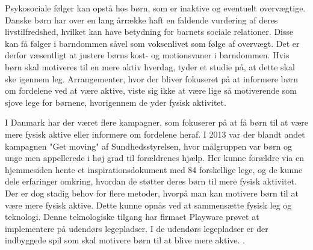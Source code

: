 
Psykosociale følger kan opstå hos børn, som er inaktive og eventuelt overvægtige. Danske børn har over en lang årrække haft en faldende vurdering af deres livstilfredshed, hvilket kan have betydning for barnets sociale relationer. Disse kan få følger i barndommen såvel som voksenlivet som følge af overvægt. Det er derfor væsentligt at justere børns kost- og motionsvaner i barndommen. \citep{Universitet2014,StatensInstitutforFolkesundhed2007} Hvis børn skal motiveres til en mere aktiv hverdag, tyder et studie på, at dette skal ske igennem leg. Arrangementer, hvor der bliver fokuseret på at informere børn om fordelene ved at være aktive, viste sig ikke at være lige så motiverende som sjove lege for børnene, hvorigennem de yder fysisk aktivitet. %
\citep{J.Sebire2013}

I Danmark har der været flere kampagner, som fokuserer på at få børn til at være mere fysisk aktive eller informere om fordelene heraf. I 2013 var der blandt andet kampagnen "Get moving" af Sundhedsstyrelsen, hvor målgruppen var børn og unge men appellerede i høj grad til forældrenes hjælp. Her kunne forældre via en hjemmesiden hente et inspirationsdokument med 84 forskellige lege, og de kunne dele erfaringer omkring, hvordan de støtter deres børn til mere fysisk aktivitet. \citep{Sundhedsstyrelsen2013} Der er dog stadig behov for flere metoder, hvorpå man kan motivere børn til at være mere fysisk aktive. Dette kunne opnås ved at sammensætte fysisk leg og teknologi. Denne teknologiske tilgang har firmaet Playware prøvet at implementere på udendørs legepladser. I de udendørs legepladser er der indbyggede spil som skal motivere børn til at blive mere aktive. \citep{Rishoej2010}.

